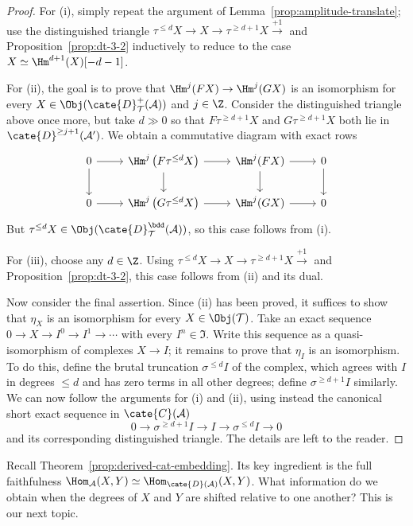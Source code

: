 \begin{proof}
	For (i), simply repeat the argument of
	Lemma~\ref{prop:amplitude-translate}; use the distinguished triangle
	$\tau^{\leq d}X\to X\to\tau^{\geq d+1}X\xrightarrow{+1}$ and
	Proposition~\ref{prop:dt-3-2} inductively to reduce to the case
	$X\simeq\Hm^{d+1}(X)[-d-1]$.

	For (ii), the goal is to prove that $\Hm^j(FX)\to\Hm^j(GX)$ is an
	isomorphism for every
	$X\in\Obj(\cate{D}^+_{\mathcal{T}}(\mathcal{A}))$ and $j\in\Z$.
	Consider the distinguished triangle above once more, but take $d\gg0$ so
	that $F\tau^{\geq d+1}X$ and $G\tau^{\geq d+1}X$ both lie in
	$\cate{D}^{\geq j+1}(\mathcal{A}')$. We obtain a commutative diagram with
	exact rows
	\[\begin{tikzcd}
		0 \arrow[r] \arrow[d] & \Hm^j\left(F\tau^{\leq d}X\right) \arrow[r] \arrow[d] & \Hm^j(FX) \arrow[d] \arrow[r] & 0 \arrow[d] \\
		0 \arrow[r] & \Hm^j\left(G\tau^{\leq d}X\right) \arrow[r] & \Hm^j(GX) \arrow[r] & 0
	\end{tikzcd}\]
	But $\tau^{\leq d}X\in
	\Obj(\cate{D}^{\bdd}_{\mathcal{T}}(\mathcal{A}))$, so this case
	follows from (i).

	For (iii), choose any $d\in\Z$. Using
	$\tau^{\leq d}X\to X\to\tau^{\geq d+1}X\xrightarrow{+1}$ and
	Proposition~\ref{prop:dt-3-2}, this case follows from (ii) and its dual.

	Now consider the final assertion. Since (ii) has been proved, it suffices
	to show that $\eta_X$ is an isomorphism for every
	$X\in\Obj(\mathcal{T})$. Take an exact sequence
	$0\to X\to I^0\to I^1\to\cdots$ with every $I^n\in\mathfrak{I}$.
	Write this sequence as a quasi-isomorphism of complexes $X\to I$; it
	remains to prove that $\eta_I$ is an isomorphism. To do this, define the
	brutal truncation $\sigma^{\leq d}I$ of the complex, which agrees with
	$I$ in degrees $\leq d$ and has zero terms in all other degrees; define
	$\sigma^{\geq d+1}I$ similarly. We can now follow the arguments for (i)
	and (ii), using instead the canonical short exact sequence in
	$\cate{C}(\mathcal{A})$
	\[ 0\to\sigma^{\geq d+1}I\to I\to\sigma^{\leq d}I\to0 \]
	and its corresponding distinguished triangle. The details are left to the
	reader.
\end{proof}

Recall Theorem~\ref{prop:derived-cat-embedding}. Its key ingredient is the
full faithfulness
$\Hom_{\mathcal{A}}(X,Y)\simeq\Hom_{\cate{D}(\mathcal{A})}(X,Y)$.
What information do we obtain when the degrees of $X$ and $Y$ are shifted
relative to one another? This is our next topic.

